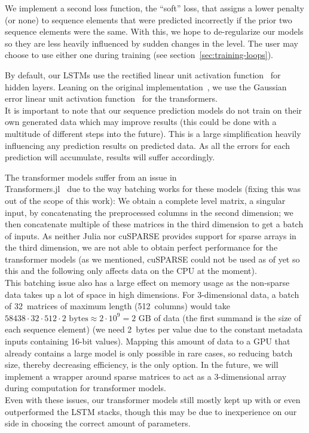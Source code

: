 We implement a second loss function, the ``soft'' loss, that assigns a
lower penalty (or none) to sequence elements that were predicted
incorrectly if the prior two sequence elements were the same. With
this, we hope to de-regularize our models so they are less heavily
influenced by sudden changes in the level. The user may choose to use
either one during training (see section~\ref{sec:training-loops}).

By default, our LSTMs use the rectified linear unit activation
function~\cite{nairRectifiedLinearUnits,RectifierNeuralNetworks2019}
for hidden layers. Leaning on the original
implementation~\cite{OpenaiGpt22019}, we use the Gaussian error linear
unit activation function~\cite{hendrycksGaussianErrorLinear2018} for
the transformers. \\
It is important to note that our sequence prediction models do not
train on their own generated data which may improve results (this
could be done with a multitude of different steps into the future).
This is a large simplification heavily influencing any prediction
results on predicted data. As all the errors for each prediction will
accumulate, results will suffer accordingly.

The transformer models suffer from an issue in \\
\mbox{Transformers.jl}~\cite{peterChengchingwenTransformersJl2019} due
to the way batching works for these models (fixing this was out of the
scope of this work): We obtain a complete level matrix, a singular
input, by concatenating the preprocessed columns in the second
dimension; we then concatenate multiple of these matrices in the third
dimension to get a batch of inputs. As neither Julia nor cuSPARSE
provides support for sparse arrays in the third dimension, we are not
able to obtain perfect performance for the transformer models (as we
mentioned, cuSPARSE could not be used as of yet so this and the
following only affects data on the CPU at the moment). \\
This batching issue also has a large effect on memory usage as the
non-sparse data takes up a lot of space in high dimensions. For
3-dimensional data, a batch of 32~matrices of maximum length
(512~columns) would take
$58438 \cdot 32 \cdot 512 \cdot 2\text{ bytes} \approx 2 \cdot 10^{9} = 2\text{ GB}$ of data
(the first summand is the size of each sequence element) (we need
2~bytes per value due to the constant metadata inputs containing
16-bit values). Mapping this amount of data to a GPU that already
contains a large model is only possible in rare cases, so reducing
batch size, thereby decreasing efficiency, is the only option. In the
future, we will implement a wrapper around sparse matrices to act as a
3-dimensional array during computation for transformer models. \\
Even with these issues, our transformer models still mostly kept up
with or even outperformed the LSTM stacks, though this may be due to
inexperience on our side in choosing the correct amount of parameters.

